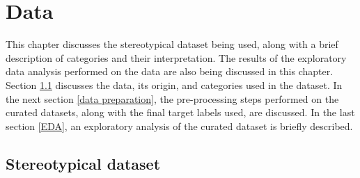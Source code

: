 \chapter{Data}

This chapter discusses the stereotypical dataset being used, along with a brief description of categories and their interpretation. The results of the exploratory data analysis performed on the data are also being discussed in this chapter. Section \ref{stereotypical dataset} discusses the data, its origin, and categories used in the dataset. In the next section \ref{data preparation}, the pre-processing steps performed on the curated datasets, along with the final target labels used, are discussed. In the last section \ref{EDA}, an exploratory analysis of the curated dataset is briefly described.

\section{Stereotypical dataset}\label{stereotypical dataset}
